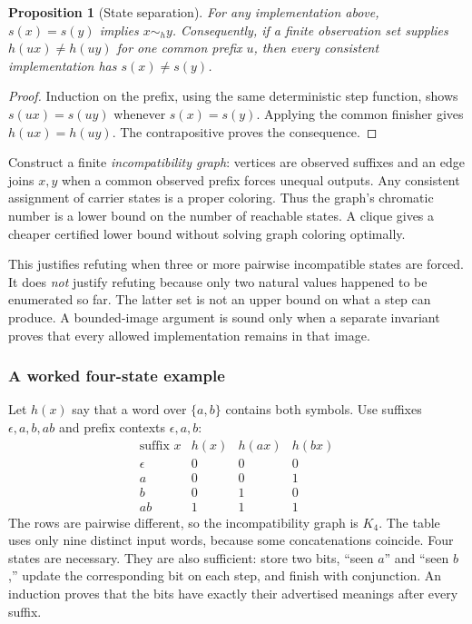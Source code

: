 \documentclass[11pt,a4paper]{article}
\newcommand{\code}[1]{\texttt{\detokenize{#1}}}
\newtheorem{proposition}[theorem]{Proposition}
\theoremstyle{definition}
\theoremstyle{remark}
\begin{document}
\begin{proposition}[State separation]\label{prop:separation}
For any implementation above, $s(x)=s(y)$ implies $x\sim_h y$. Consequently, if a finite observation set supplies $h(ux)\ne h(uy)$ for one common prefix $u$, then every consistent implementation has $s(x)\ne s(y)$.
\end{proposition}
\begin{proof}
Induction on the prefix, using the same deterministic step function, shows $s(ux)=s(uy)$ whenever $s(x)=s(y)$. Applying the common finisher gives $h(ux)=h(uy)$. The contrapositive proves the consequence.
\end{proof}

Construct a finite \emph{incompatibility graph}: vertices are observed suffixes and an edge joins $x,y$ when a common observed prefix forces unequal outputs. Any consistent assignment of carrier states is a proper coloring. Thus the graph's chromatic number is a lower bound on the number of reachable states. A clique gives a cheaper certified lower bound without solving graph coloring optimally.

This justifies refuting \code{Bool} when three or more pairwise incompatible states are forced. It does \emph{not} justify refuting \code{Nat} because only two natural values happened to be enumerated so far. The latter set is not an upper bound on what a step can produce. A bounded-image argument is sound only when a separate invariant proves that every allowed implementation remains in that image.

\subsubsection*{A worked four-state example}

Let $h(x)$ say that a word over $\{a,b\}$ contains both symbols. Use suffixes $\epsilon,a,b,ab$ and prefix contexts $\epsilon,a,b$:
\[
\begin{array}{c|ccc}
\text{suffix }x & h(x)&h(ax)&h(bx)\\\hline
\epsilon&0&0&0\\
a&0&0&1\\
b&0&1&0\\
ab&1&1&1
\end{array}
\]
The rows are pairwise different, so the incompatibility graph is $K_4$. The table uses only nine distinct input words, because some concatenations coincide. Four states are necessary. They are also sufficient: store two bits, ``seen $a$'' and ``seen $b$,'' update the corresponding bit on each step, and finish with conjunction. An induction proves that the bits have exactly their advertised meanings after every suffix.
\end{document}
